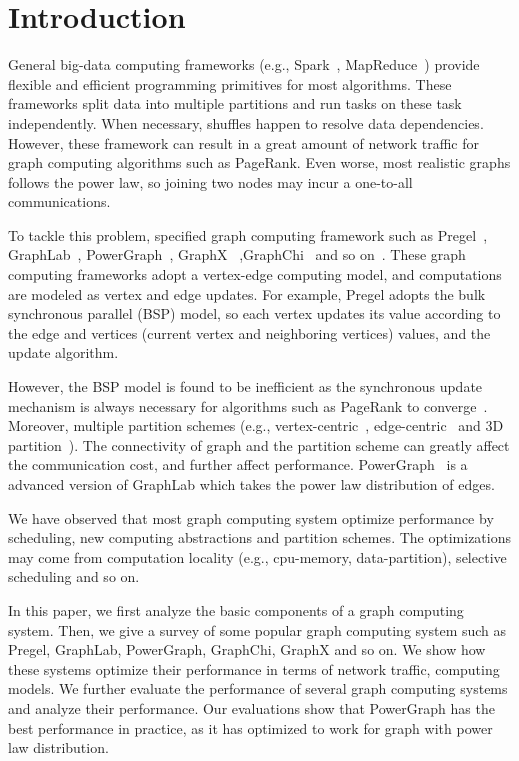 \documentclass{acm_proc_article}
\newcommand{\eg}[0]{e.g.,}
\begin{document}
\section{Introduction}
General big-data computing frameworks (\eg{} Spark~\cite{spark}, MapReduce~\cite{mapreduce}) provide
flexible and efficient programming primitives for most algorithms.
These frameworks split data into multiple partitions and run tasks on
these task independently. When necessary, shuffles happen to resolve data
dependencies.
However, these framework can result in a great amount of network traffic
for graph computing algorithms such as PageRank. Even worse, most realistic graphs
follows the power law, so joining two nodes may incur a one-to-all communications.

To tackle this problem, specified graph computing framework such as
Pregel~\cite{pregel},
GraphLab~\cite{graphlab}, PowerGraph~\cite{powergraph}, GraphX~\cite{graphx}
,GraphChi~\cite{graphchi} and so on~\cite{distributed:graphlab,kineograph}. These graph computing frameworks
adopt a vertex-edge computing model, and computations are modeled
as vertex and edge updates. For example, Pregel adopts the bulk
synchronous parallel (BSP) model, so each vertex updates its value according
to the edge and vertices (current vertex and neighboring vertices) values, and
the update algorithm.

However, the BSP model is found to be inefficient as the synchronous update
mechanism is always necessary for algorithms such as PageRank to
converge~\cite{graphlab,powergraph}. Moreover, multiple partition schemes (\eg{} vertex-centric~\cite{pregel},
edge-centric~\cite{xstream} and 3D partition~\cite{cube:osdi16}). The connectivity
of graph and the partition scheme can greatly affect the communication cost, and
further affect performance. PowerGraph~\cite{powergraph} is a advanced version of
GraphLab which takes the power law distribution of edges.

We have observed that most graph computing system optimize performance by
scheduling, new computing abstractions and partition schemes. The optimizations
may come from computation locality (\eg{} cpu-memory, data-partition),
selective scheduling and so on.

In this paper, we first analyze the basic components of a graph computing
system. Then, we give a survey of some popular graph computing system
such as Pregel, GraphLab, PowerGraph, GraphChi, GraphX and so on. We show
how these systems optimize their performance in terms of network traffic,
computing models.
We further evaluate the performance of several graph computing systems
and analyze their performance.
Our evaluations show that PowerGraph has the best performance in practice,
as it has optimized to work for graph with power law distribution.
\end{document}
